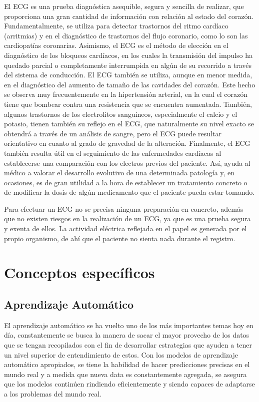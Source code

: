 \documentclass[12pt,letterpaper,oneside,openright]{book}
\begin{document}
El ECG es una prueba diagnóstica asequible, segura y sencilla de realizar, que proporciona una gran cantidad de información con relación al estado del corazón. Fundamentalmente, se utiliza para detectar trastornos del ritmo cardíaco (arritmias) y en el diagnóstico de trastornos del flujo coronario, como lo son las cardiopatías coronarias. Asimismo, el ECG es el método de elección en el diagnóstico de los bloqueos cardíacos, en los cuales la transmisión del impulso ha quedado parcial o completamente interrumpida en algún de su recorrido a través del sistema de conducción. El ECG también se utiliza, aunque en menor medida, en el diagnóstico del aumento de tamaño de las cavidades del corazón. Este hecho se observa muy frecuentemente en la hipertensión arterial, en la cual el corazón tiene que bombear contra una resistencia que se encuentra aumentada. También, algunos trastornos de los electrolitos sanguíneos, especialmente el calcio y el potasio, tienen también su reflejo en el ECG, que naturalmente su nivel exacto se obtendrá a través de un análisis de sangre, pero el ECG puede resultar orientativo en cuanto al grado de gravedad de la alteración. Finalmente, el ECG también resulta útil en el seguimiento de las enfermedades cardíacas al establecerse una comparación con los electros previos del paciente. Así, ayuda al médico a valorar el desarrollo evolutivo de una determinada patología y, en ocasiones, es de gran utilidad a la hora de establecer un tratamiento concreto o de modificar la dosis de algún medicamento que el paciente pueda estar tomando. 

Para efectuar un ECG no se precisa ninguna preparación en concreto, además que no existen riesgos en la realización de un ECG, ya que es una prueba segura y exenta de ellos. La actividad eléctrica reflejada en el papel es generada por el propio organismo, de ahí que el paciente no sienta nada durante el registro. 

\section{Conceptos específicos}

\subsection{Aprendizaje Automático}
	El aprendizaje automático se ha vuelto uno de los más importantes temas hoy en día, constantemente se busca la manera de sacar el mayor provecho de los datos que se tengan recopilados con el fin de desarrollar estrategias que ayuden a tener un nivel superior de entendimiento de estos. Con los modelos de aprendizaje automático apropiados, se tiene la habilidad de hacer predicciones precisas en el mundo real y a medida que nueva data es constantemente agregada, se asegura que los modelos continúen rindiendo eficientemente y siendo capaces de adaptarse a los problemas del mundo real. 
\end{document}
